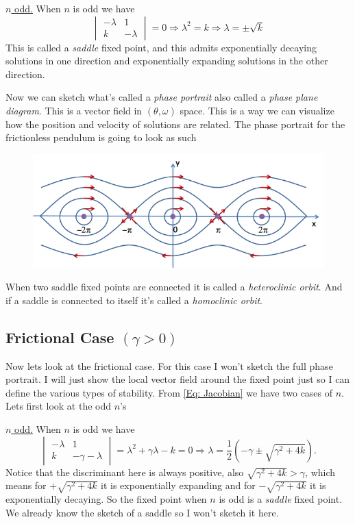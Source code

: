 \documentclass[reqno]{amsart}
\theoremstyle{definition}
\begin{document}
\underline{\Large $n$ odd.}  When $n$ is odd we have
%
\begin{equation}
\begin{vmatrix}
-\lambda & 1\\
k & -\lambda
\end{vmatrix} = 0 \Rightarrow \lambda^2 = k \Rightarrow \lambda = \pm\sqrt{k}
\end{equation}
%
This is called a \emph{saddle} fixed point, and this admits exponentially decaying solutions in
one direction and exponentially expanding solutions in the other direction.

Now we can sketch what's called a \emph{phase portrait} also called a \emph{phase plane diagram}.
This is a vector field in $(\theta,\omega)$ space.  This is a way we can visualize how the position
and velocity of solutions are related.  The phase portrait for the frictionless pendulum is going to look
as such
%
\begin{figure}[htbp]
\includegraphics[width = \textwidth]{pendulum-portrait}
\end{figure}
%
When two saddle fixed points are connected it is called a \emph{heteroclinic orbit}.
And if a saddle is connected to itself it's called a \emph{homoclinic orbit}.
%

\subsection*{Frictional Case $(\gamma > 0)$}  Now lets look at the frictional case.
For this case I won't sketch the full phase portrait.  I will just show the local vector
field around the fixed point just so I can define the various types of stability.
From \eqref{Eq: Jacobian} we have two cases of $n$.  Lets first look at the odd $n$'s

\underline{\Large $n$ odd.}  When $n$ is odd we have
%
\begin{equation}
\begin{vmatrix}
-\lambda & 1\\
 k & -\gamma - \lambda
\end{vmatrix} = \lambda^2 + \gamma \lambda - k = 0 \Rightarrow \lambda
= \frac{1}{2}\left(-\gamma \pm \sqrt{\gamma^2 + 4k}\right).
\end{equation}
%
Notice that the discriminant here is always positive, also $\sqrt{\gamma^2 + 4k} > \gamma$,
which means for $+\sqrt{\gamma^2 + 4k}$ it is exponentially expanding and for
$-\sqrt{\gamma^2 + 4k}$ it is exponentially decaying.  So the fixed point when $n$ is odd
is a \emph{saddle} fixed point.  We already know the sketch of a saddle so I won't sketch it here.
\end{document}
